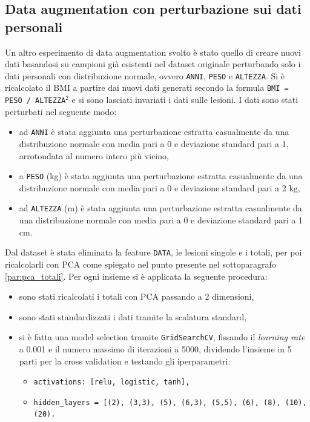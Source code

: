 \documentclass[12pt, twoside, letterpaper]{report}
\begin{document}
		\subsection{Data augmentation con perturbazione sui dati personali} \label{sec:data_aug_pers}
			Un altro esperimento di data augmentation svolto è stato quello di creare nuovi dati basandosi su campioni già esistenti nel dataset originale perturbando solo i dati personali con distribuzione normale, ovvero \texttt{ANNI}, \texttt{PESO} e \texttt{ALTEZZA}. Si è ricalcolato il BMI a partire dai nuovi dati generati secondo la formula \texttt{BMI = PESO / ALTEZZA$^2$} e si sono lasciati invariati i dati sulle lesioni. I dati sono stati perturbati nel seguente modo: 
			\begin{itemize}
			\item ad \texttt{ANNI} è stata aggiunta una perturbazione estratta casualmente da una distribuzione normale con media pari a 0 e deviazione standard pari a 1, arrotondata al numero intero più vicino,
			\item a \texttt{PESO} (kg) è stata aggiunta una perturbazione estratta casualmente da una distribuzione normale con media pari a 0 e deviazione standard pari a 2 kg,
			\item ad \texttt{ALTEZZA} (m) è stata aggiunta una perturbazione estratta casualmente da una distribuzione normale con media pari a 0 e deviazione standard pari a 1 cm.
			\end{itemize}
			Dal dataset è stata eliminata la feature \texttt{DATA}, le lesioni singole e i totali, per poi ricalcolarli con PCA come spiegato nel punto \textit{} presente nel sottoparagrafo \ref{par:pca_totali}. Per ogni insieme si è applicata la seguente procedura:
				\begin{itemize}
				\item sono stati ricalcolati i totali con PCA passando a 2 dimensioni,
				\item sono stati standardizzati i dati tramite la scalatura standard,
				\item si è fatta una model selection tramite \texttt{GridSearchCV}, fissando il \textit{learning rate} a 0.001 e il numero massimo di iterazioni a 5000, dividendo l'insieme in 5 parti per la cross validation e testando gli iperparametri:
				 	\begin{itemize}
					\item \texttt{activations: [relu, logistic, tanh],}
    				\item \texttt{hidden\_layers = [(2), (3,3), (5), (6,3), (5,5), (6), (8), (10), (20).}
					\end{itemize}
				 \end{itemize}
\end{document}
